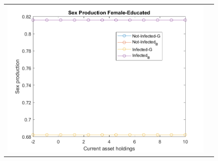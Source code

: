 \begin{figure}[H]
\begin{center}
\begin{tabular}{cc}
\includegraphics[angle=0,width=.5\textwidth]{figures/FIG8.png} \\
\end{tabular}
\end{center}
\label{fig:3}
\end{figure}



